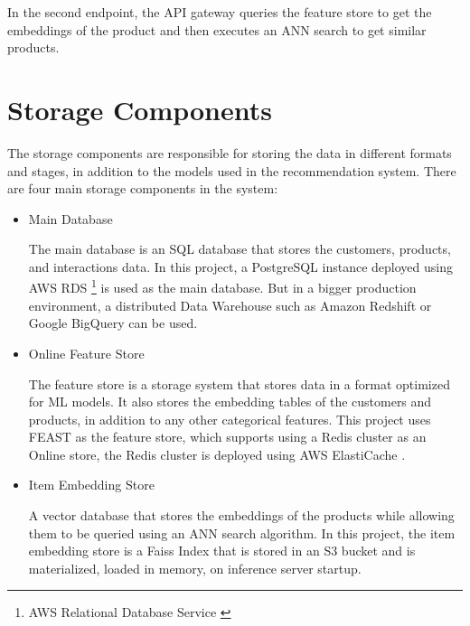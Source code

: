 In the second endpoint, the API gateway queries the feature store to get the embeddings of the product and then executes an ANN search to get similar products.

\section{Storage Components}

The storage components are responsible for storing the data in different formats and stages, in addition to the models used in the recommendation system.
There are four main storage components in the system:

\begin{itemize}
    \item Main Database
    \begin{displayquote}
        The main database is an SQL database that stores the customers, products, and
         interactions data. In this project, a PostgreSQL \cite{Postgres} instance 
         deployed using AWS RDS \footnote{AWS Relational Database Service \cite{AwsRDS}}
         is used as the main database. 
         But in a bigger production environment, a distributed Data Warehouse such as 
         Amazon Redshift \cite{AwsRedshift} or Google BigQuery \cite{GoogleBigQuery} can be used.
    \end{displayquote}
    \item Online Feature Store
    \begin{displayquote}
        The feature store is a storage system that stores data in a format optimized for ML models. \cite{NvidiaFeatureStores}
        It also stores the embedding tables of the customers 
        and products, in addition to any other categorical features.
        This project uses FEAST \cite{feast} as the feature store, which supports using a Redis \cite{Redis} 
        cluster as an Online store, the Redis cluster is deployed using AWS ElastiCache \cite{AwsElastiCache}.
    \end{displayquote}

    \item Item Embedding Store
    \begin{displayquote}
        A vector database that stores the embeddings of the products
        while allowing them to be queried using an ANN search algorithm. 
        In this project, the item embedding store is a Faiss Index\cite{Faiss} that is stored in an S3 bucket and is materialized, loaded in memory, on inference server startup.
    \end{displayquote}


\end{itemize}
